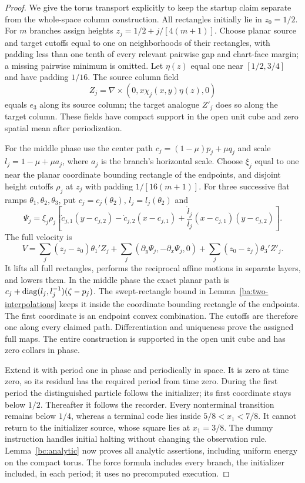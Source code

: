 \begin{proof}
We give the torus transport explicitly to keep the startup claim separate
from the whole-space column construction. All rectangles initially lie in
$z_0=1/2$. For $m$ branches assign heights
$z_j=1/2+j/[4(m+1)]$. Choose planar source and target cutoffs equal to
one on neighborhoods of their rectangles, with padding less than one tenth
of every relevant pairwise gap and chart-face margin; a missing pairwise
minimum is omitted. Let $\eta(z)$ equal one near $[1/2,3/4]$ and have
padding $1/16$. The source column field
\[
 Z_j=\nabla\times(0,x\chi_j(x,y)\eta(z),0)
\]
equals $e_3$ along its source column; the target analogue $Z'_j$ does
so along the target column. These fields have compact support in the
open unit cube and zero spatial mean after periodization.

For the middle phase use the center path
$c_j=(1-\mu)p_j+\mu q_j$ and scale
$l_j=1-\mu+\mu a_j$, where $a_j$ is the branch's horizontal scale.
Choose $\xi_j$ equal to one near the planar coordinate bounding rectangle
of the endpoints, and disjoint height cutoffs $\rho_j$ at $z_j$ with
padding $1/[16(m+1)]$. For three successive flat ramps $\theta_1,
\theta_2,\theta_3$, put $c_j=c_j(\theta_2)$, $l_j=l_j(\theta_2)$ and
\[
 \Psi_j=\xi_j\rho_j\left[
 \dot c_{j,1}(y-c_{j,2})-\dot c_{j,2}(x-c_{j,1})
       +\frac{\dot l_j}{l_j}(x-c_{j,1})(y-c_{j,2})\right].
\]
The full velocity is
\begin{equation}\label{bc:unit-V}
 V=\sum_j(z_j-z_0)\theta_1'Z_j
       +\sum_j(\partial_y\Psi_j,-\partial_x\Psi_j,0)
       +\sum_j(z_0-z_j)\theta_3'Z'_j.
\end{equation}
It lifts all full rectangles, performs the reciprocal affine motions in
separate layers, and lowers them. In the middle phase the exact planar path
is $c_j+\operatorname{diag}(l_j,l_j^{-1})(\zeta-p_j)$. The swept-rectangle bound in
Lemma~\ref{ba:two-interpolations} keeps it inside the coordinate bounding
rectangle of the endpoints. The first coordinate is an endpoint convex combination.
The cutoffs are therefore one along every claimed path. Differentiation
and uniqueness prove the assigned full maps. The entire construction is
supported in the open unit cube and has zero collars in phase.

Extend it with period one in phase and periodically in space. It is zero
at time zero, so its residual has the required period from time zero.
During the first period the distinguished particle follows the initializer;
its first coordinate stays below $1/2$. Thereafter it follows the recorder.
Every nonterminal transition remains below $1/4$, whereas a terminal code
lies inside $5/8<x_1<7/8$. It cannot return to the initializer source,
whose square lies at $x_1=3/8$. The dummy instruction handles initial
halting without changing the observation rule. Lemma~\ref{bc:analytic}
now proves all analytic assertions, including uniform energy on the compact
torus. The force formula includes every branch, the initializer included,
in each period; it uses no precomputed execution.
\end{proof}


